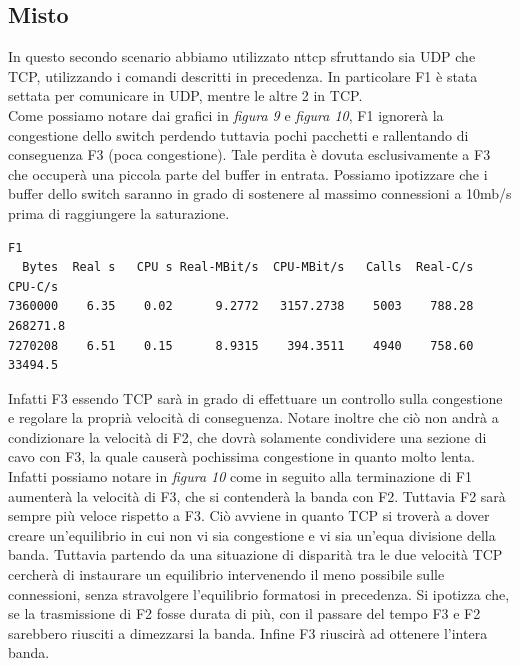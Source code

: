 \documentclass[12pt]{article}
\begin{document}
\subsection{Misto}
In questo secondo scenario abbiamo utilizzato nttcp sfruttando sia UDP che TCP, utilizzando i comandi descritti in precedenza.
In particolare F1 è stata settata per comunicare in UDP, mentre le altre 2 in TCP.\\
Come possiamo notare dai grafici in \textit{figura 9} e \textit{figura 10}, F1 ignorerà la congestione dello switch perdendo tuttavia pochi pacchetti e rallentando di conseguenza F3 (poca congestione). Tale perdita è dovuta esclusivamente a F3 che occuperà una piccola parte del buffer in entrata. Possiamo ipotizzare che i buffer dello switch saranno in grado di sostenere al massimo connessioni a 10mb/s prima di raggiungere la saturazione.
\begin{verbatim}
F1
  Bytes  Real s   CPU s Real-MBit/s  CPU-MBit/s   Calls  Real-C/s   CPU-C/s
7360000    6.35    0.02      9.2772   3157.2738    5003    788.28  268271.8
7270208    6.51    0.15      8.9315    394.3511    4940    758.60   33494.5
\end{verbatim}
Infatti F3 essendo TCP sarà in grado di effettuare un controllo sulla congestione e regolare la proprià velocità di conseguenza. Notare inoltre che ciò non andrà a condizionare la velocità di F2, che dovrà solamente condividere una sezione di cavo con F3, la quale causerà pochissima congestione in quanto molto lenta. Infatti possiamo notare in \textit{figura 10} come in seguito alla terminazione di F1 aumenterà la velocità di F3, che si contenderà la banda con F2. Tuttavia F2 sarà sempre più veloce rispetto a F3. Ciò avviene in quanto TCP si troverà a dover creare un'equilibrio in cui non vi sia congestione e vi sia un'equa divisione della banda. Tuttavia partendo da una situazione di disparità tra le due velocità TCP cercherà di instaurare un equilibrio intervenendo il meno possibile sulle connessioni, senza stravolgere l'equilibrio formatosi in precedenza. Si ipotizza che, se la trasmissione di F2 fosse durata di più, con il passare del tempo F3 e F2 sarebbero riusciti a dimezzarsi la banda.
Infine F3 riuscirà ad ottenere l'intera banda.
\end{document}
